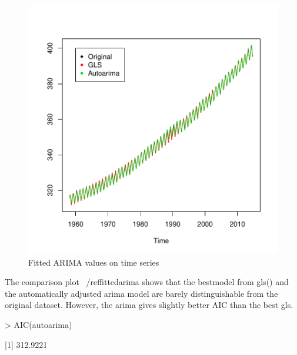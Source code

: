 \documentclass[11pt, a4paper]{article} %
\begin{document}
\begin{figure}[H]
\centering
\begin{Schunk}
\end{Schunk}
\includegraphics{alleselena-fittedarima}
\caption{Fitted ARIMA values on time series}
\label{fittedarima}
\end{figure}


The comparison plot ~/ref{fittedarima} shows that the bestmodel from gls() and the automatically adjusted arima model are barely distinguishable from the original dataset. However, the arima gives slightly better AIC than the best gls. 

\begin{Schunk}
\begin{Sinput}
> AIC(autoarima)
\end{Sinput}
[1] 312.9221\end{Schunk}
\end{document}
